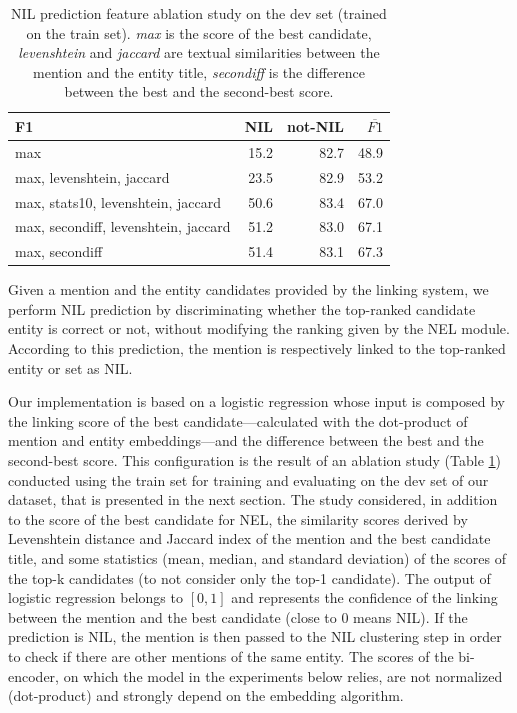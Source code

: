 \begin{table}
    \centering
\begin{tabular}{lrrr}
\toprule
F1 &  NIL &  not-NIL &  $\overline{F1}$  \\

\midrule
max                               &  15.2 &  82.7 &          48.9 \\
max, levenshtein, jaccard           &  23.5 &  82.9 &          53.2 \\
max, stats10, levenshtein, jaccard   &  50.6 &  83.4 &          67.0 \\
max, secondiff, levenshtein, jaccard &  51.2 &  83.0 &          67.1 \\
max, secondiff                     &  51.4 &  83.1 &          67.3 \\
\bottomrule
\end{tabular}
    \caption{NIL prediction feature ablation study on the dev set (trained on the train set). \textit{max} is the score of the best candidate, \textit{levenshtein} and \textit{jaccard} are textual similarities between the mention and the entity title, \textit{secondiff} is the difference between the best and the second-best score.}
    \label{tab:feature_ablation_study}
\end{table}


Given a mention and the entity candidates provided by the linking system, we perform NIL prediction by discriminating whether the top-ranked candidate entity is correct or not, without modifying the ranking given by the NEL module. According to this prediction, the mention is respectively linked to the top-ranked entity or set as NIL.

Our implementation is based on a logistic regression whose input is composed by %
the linking score of the best candidate---calculated with the dot-product of mention and entity embeddings---and the difference between the best and the second-best score.
This configuration is the result of an ablation study (Table \ref{tab:feature_ablation_study}) conducted using the train set for training and evaluating on the dev set of our dataset, that is presented in the next section. The study considered, in addition to the score of the best candidate for NEL, the similarity scores derived by Levenshtein distance and Jaccard index of the mention and the best candidate title, and some statistics (mean, median, and standard deviation) of the scores of the top-k candidates (to not consider only the top-1 candidate).
The output of logistic regression belongs to $[0,1]$ and represents the confidence of the linking between the mention and the best candidate (close to 0 means NIL).
If the prediction is NIL, the mention is then passed to the NIL clustering step in order to check if there are other mentions of the same entity.
The scores of the bi-encoder, on which the model in the experiments below relies, are not normalized (dot-product) and strongly depend on the embedding algorithm.


